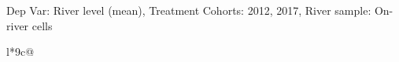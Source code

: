 \begin{table}[H]
\captionlistentry[table]{}
\label{table:beaver_hydrometry_DVlevel_mean_SCg12}
\tiny %
Dep Var: River level (mean), Treatment Cohorts: 2012, 2017, River sample: On-river cells \\
\begin{threeparttable}
\begin{tabulary}{\textwidth}{l*{9}{c}@{}}
\toprule \toprule
\noalign{\smallskip}
\noalign{\smallskip}
\midrule \bottomrule
\end{tabulary}
\medskip
\end{threeparttable}
\end{table}
